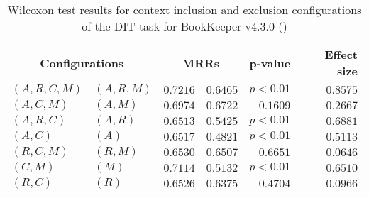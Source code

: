 
\begin{table}
\begin{spacing}{1.2}
\centering
\caption{Wilcoxon test results for context inclusion and exclusion configurations of the DIT task for BookKeeper v4.3.0 (\ctwo)}
\label{table:versus-wilcox-bookkeeper-dit-context}
\begin{tabular}{ll|rr|rr}
\toprule
      \multicolumn{2}{c|}{Configurations} &                \multicolumn{2}{c|}{MRRs} &        p-value & Effect size \\
\midrule
 $(A,R,C,M)$ &  $(A,R,M)$ &  $\bm{0.7216}$ &  $0.6465$ & $p<0.01$ &    $0.8575$ \\
   $(A,C,M)$ &    $(A,M)$ &  $\bm{0.6974}$ &  $0.6722$ & $0.1609$ &    $0.2667$ \\
   $(A,R,C)$ &    $(A,R)$ &  $\bm{0.6513}$ &  $0.5425$ & $p<0.01$ &    $0.6881$ \\
     $(A,C)$ &      $(A)$ &  $\bm{0.6517}$ &  $0.4821$ & $p<0.01$ &    $0.5113$ \\
   $(R,C,M)$ &    $(R,M)$ &  $\bm{0.6530}$ &  $0.6507$ & $0.6651$ &    $0.0646$ \\
     $(C,M)$ &      $(M)$ &  $\bm{0.7114}$ &  $0.5132$ & $p<0.01$ &    $0.6510$ \\
     $(R,C)$ &      $(R)$ &  $\bm{0.6526}$ &  $0.6375$ & $0.4704$ &    $0.0966$ \\
\bottomrule
\end{tabular}

\end{spacing}
\end{table}

